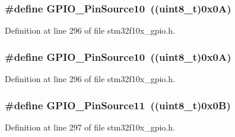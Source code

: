 \subsubsection[{\texorpdfstring{G\+P\+I\+O\+\_\+\+Pin\+Source10}{GPIO_PinSource10}}]{\setlength{\rightskip}{0pt plus 5cm}\#define G\+P\+I\+O\+\_\+\+Pin\+Source10~(({\bf uint8\+\_\+t})0x0\+A)}\hypertarget{group___g_p_i_o___pin__sources_gacec97d9c2d319b450f699adff6430c86}{}\label{group___g_p_i_o___pin__sources_gacec97d9c2d319b450f699adff6430c86}


Definition at line 296 of file stm32f10x\+\_\+gpio.\+h.

\subsubsection[{\texorpdfstring{G\+P\+I\+O\+\_\+\+Pin\+Source10}{GPIO_PinSource10}}]{\setlength{\rightskip}{0pt plus 5cm}\#define G\+P\+I\+O\+\_\+\+Pin\+Source10~(({\bf uint8\+\_\+t})0x0\+A)}\hypertarget{group___g_p_i_o___pin__sources_gacec97d9c2d319b450f699adff6430c86}{}\label{group___g_p_i_o___pin__sources_gacec97d9c2d319b450f699adff6430c86}


Definition at line 296 of file stm32f10x\+\_\+gpio.\+h.

\subsubsection[{\texorpdfstring{G\+P\+I\+O\+\_\+\+Pin\+Source11}{GPIO_PinSource11}}]{\setlength{\rightskip}{0pt plus 5cm}\#define G\+P\+I\+O\+\_\+\+Pin\+Source11~(({\bf uint8\+\_\+t})0x0\+B)}\hypertarget{group___g_p_i_o___pin__sources_ga446be4a99e84eefb5c71a643211f598b}{}\label{group___g_p_i_o___pin__sources_ga446be4a99e84eefb5c71a643211f598b}


Definition at line 297 of file stm32f10x\+\_\+gpio.\+h.

